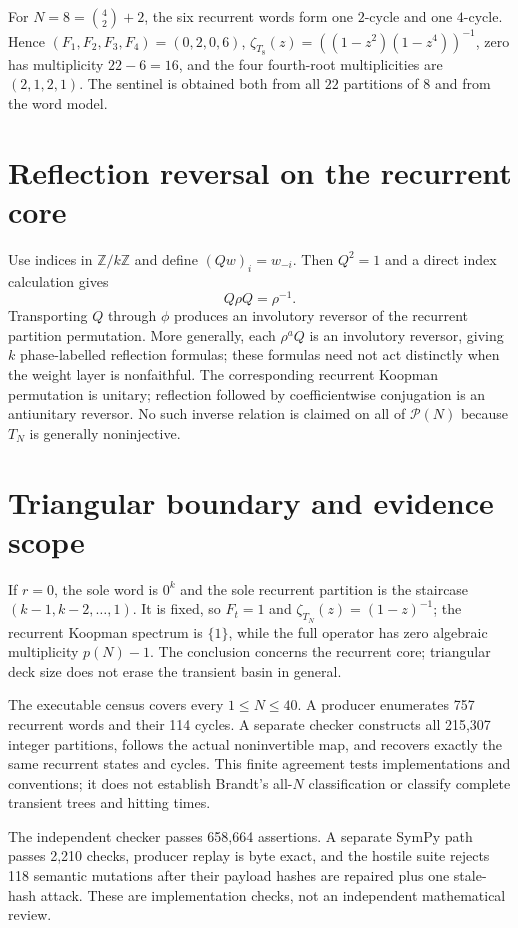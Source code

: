 \documentclass[9pt]{extarticle}
\begin{document}
For $N=8=\binom42+2$, the six recurrent words form one $2$-cycle and one
$4$-cycle.  Hence $(F_1,F_2,F_3,F_4)=(0,2,0,6)$,
$\zeta_{T_8}(z)=((1-z^2)(1-z^4))^{-1}$, zero has multiplicity $22-6=16$,
and the four fourth-root multiplicities are $(2,1,2,1)$.  The sentinel is
obtained both from all $22$ partitions of $8$ and from the word model.

\section{Reflection reversal on the recurrent core}
Use indices in $\mathbb Z/k\mathbb Z$ and define
$(Qw)_i=w_{-i}$.  Then $Q^2=1$ and a direct index calculation gives
\[
 Q\rho Q=\rho^{-1}.
\]
Transporting $Q$ through $\phi$ produces an involutory reversor of the
recurrent partition permutation.  More generally, each $\rho^aQ$ is an
involutory reversor, giving $k$ phase-labelled reflection formulas; these
formulas need not act distinctly when the weight layer is nonfaithful.  The
corresponding recurrent Koopman permutation is unitary; reflection followed
by coefficientwise conjugation is an antiunitary reversor.  No such inverse
relation is claimed on all of $\mathcal P(N)$ because $T_N$ is generally
noninjective.

\section{Triangular boundary and evidence scope}
If $r=0$, the sole word is $0^k$ and the sole recurrent partition is the
staircase $(k-1,k-2,\ldots,1)$.  It is fixed, so $F_t=1$ and
$\zeta_{T_N}(z)=(1-z)^{-1}$; the recurrent Koopman spectrum is $\{1\}$,
while the full operator has zero algebraic multiplicity $p(N)-1$.  The
conclusion concerns the recurrent core; triangular deck size does not erase
the transient basin in general.

The executable census covers every $1\le N\le40$.  A producer enumerates 757
recurrent words and their 114 cycles.  A separate checker constructs all
215,307 integer partitions, follows the actual noninvertible map, and recovers
exactly the same recurrent states and cycles.  This finite agreement tests
implementations and conventions; it does not establish Brandt's all-$N$
classification or classify complete transient trees and hitting times.

The independent checker passes 658,664 assertions.  A separate SymPy path
passes 2,210 checks, producer replay is byte exact, and the hostile suite
rejects 118 semantic mutations after their payload hashes are repaired plus
one stale-hash attack.  These are implementation checks, not an independent
mathematical review.
\end{document}
